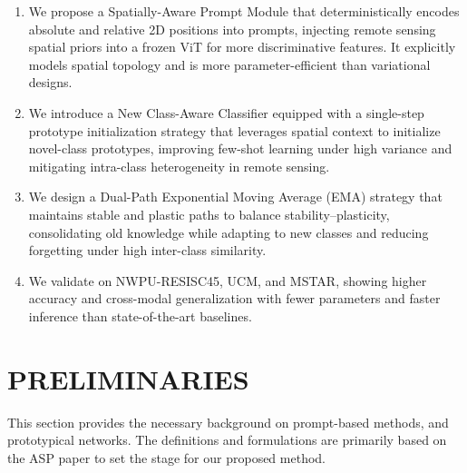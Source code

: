 ﻿\documentclass[letterpaper,journal]{IEEEtran}
\begin{document}
\begin{enumerate}
\item We propose a Spatially-Aware Prompt Module that deterministically encodes absolute and relative 2D positions into prompts, injecting remote sensing spatial priors into a frozen ViT for more discriminative features. It explicitly models spatial topology and is more parameter-efficient than variational designs.

\item We introduce a New Class-Aware Classifier equipped with a single-step prototype initialization strategy that leverages spatial context to initialize novel-class prototypes, improving few-shot learning under high variance and mitigating intra-class heterogeneity in remote sensing.

\item We design a Dual-Path Exponential Moving Average (EMA) strategy that maintains stable and plastic paths to balance stability--plasticity, consolidating old knowledge while adapting to new classes and reducing forgetting under high inter-class similarity.

\item We validate on NWPU-RESISC45, UCM, and MSTAR, showing higher accuracy and cross-modal generalization with fewer parameters and faster inference than state-of-the-art baselines.
\end{enumerate}

\section{PRELIMINARIES}
This section provides the necessary background on prompt-based methods, and prototypical networks. The definitions and formulations are primarily based on the ASP paper \cite{liu2024} to set the stage for our proposed method.
\end{document}
